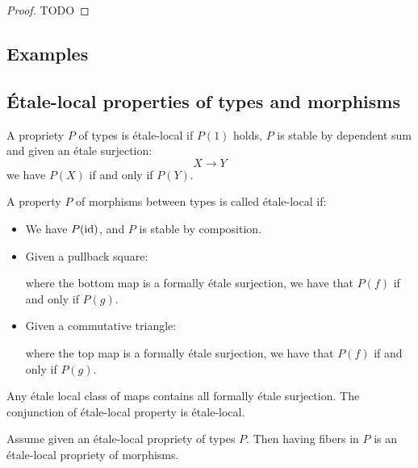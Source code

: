 \begin{proof}
TODO
\end{proof}

\subsection{Examples}

\subsection{Étale-local properties of types and morphisms}

\begin{definition}
A propriety $P$ of types is étale-local if $P(1)$ holds, $P$ is stable by dependent sum and given an étale surjection:
\[X \to Y\]
we have $P(X)$ if and only if $P(Y)$.
\end{definition}

\begin{definition}
A property $P$ of morphisms between types is called étale-local if:
\begin{itemize}
\item We have $P(\mathrm{id})$, and $P$ is stable by composition.
\item Given a pullback square:
  \begin{center}
  \end{center}
 where the bottom map is a formally étale surjection, we have that $P(f)$ if and only if $P(g)$.
\item Given a commutative triangle:
  \begin{center}
  \end{center}
  where the top map is a formally étale surjection, we have that $P(f)$ if and only if $P(g)$.
\end{itemize}
\end{definition}

Any étale local class of maps contains all formally étale surjection. The conjunction of étale-local property is étale-local.

\begin{lemma}\label{etale-local-morphisms-from-types}
Assume given an étale-local propriety of types $P$. Then having fibers in $P$ is an étale-local propriety of morphisms. 
\end{lemma}

